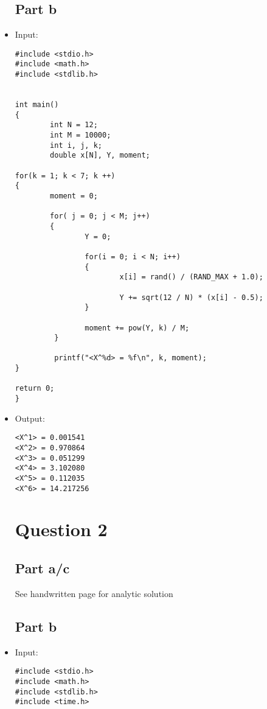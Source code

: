 \documentclass[10pt]{article}
\begin{document}
\begin{itemize}
\subsection*{Part b}
\item Input:
\begin{verbatim}
#include <stdio.h>
#include <math.h>
#include <stdlib.h>


int main()
{
        int N = 12;
        int M = 10000;
        int i, j, k;
        double x[N], Y, moment;

for(k = 1; k < 7; k ++)
{
        moment = 0;
        
        for( j = 0; j < M; j++)
        {
                Y = 0;

                for(i = 0; i < N; i++)
                {
                        x[i] = rand() / (RAND_MAX + 1.0);

                        Y += sqrt(12 / N) * (x[i] - 0.5);
                }

                moment += pow(Y, k) / M;
         }
         
         printf("<X^%d> = %f\n", k, moment);
}

return 0;
}
\end{verbatim}
\item Output:
\begin{verbatim}
<X^1> = 0.001541
<X^2> = 0.970864
<X^3> = 0.051299
<X^4> = 3.102080
<X^5> = 0.112035
<X^6> = 14.217256
\end{verbatim}

\section*{Question 2}
\subsection*{Part a/c}
See handwritten page for analytic solution

\subsection*{Part b}
\item Input:
\begin{verbatim}
#include <stdio.h>
#include <math.h>
#include <stdlib.h>
#include <time.h>


\end{verbatim}
\end{itemize}
\end{document}
